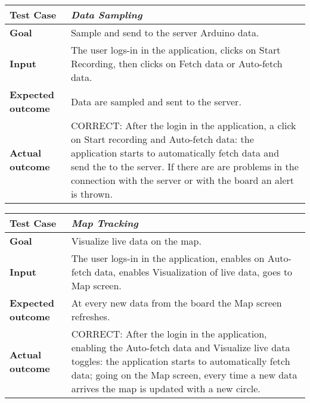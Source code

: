 \begin{table}[H]
\begin{tabular}{| p{} | p{} |}
  \hline
  \textbf{Test Case} & \textit{Data Sampling} \\ \hline
  \textbf{Goal} & Sample and send to the server Arduino data. \\ \hline
  \textbf{Input} & The user logs-in in the application, clicks on Start Recording, then clicks on Fetch data or Auto-fetch data. \\ \hline
  \textbf{Expected outcome} & Data are sampled and sent to the server. \\ \hline
  \textbf{Actual outcome} & CORRECT: After the login in the application, a click on Start recording and Auto-fetch data: the application starts to automatically fetch data and send the to the server. If there are are problems in the connection with the server or with the board an alert is thrown. \\ \hline
\end{tabular}
\end{table}

\begin{table}[H]
\begin{tabular}{| p{} | p{} |}
  \hline
  \textbf{Test Case} & \textit{Map Tracking} \\ \hline
  \textbf{Goal} & Visualize live data on the map. \\ \hline
  \textbf{Input} & The user logs-in in the application, enables on Auto-fetch data, enables Visualization of live data, goes to Map screen. \\ \hline
  \textbf{Expected outcome} & At every new data from the board the Map screen refreshes. \\ \hline
  \textbf{Actual outcome} & CORRECT: After the login in the application, enabling the Auto-fetch data and Visualize live data toggles: the application starts to automatically fetch data; going on the Map screen, every time a new data arrives the map is updated with a new circle. \\ \hline
\end{tabular}
\end{table}

